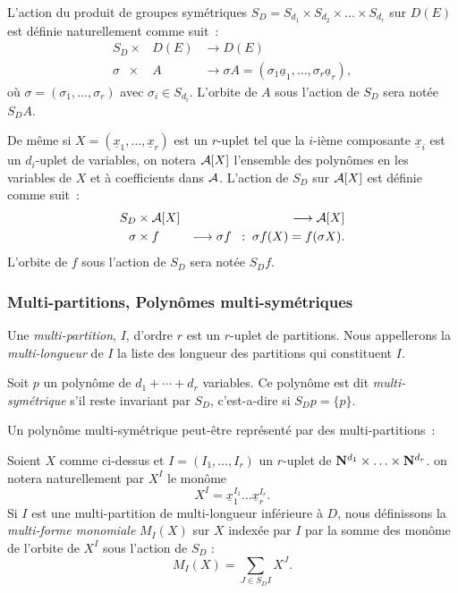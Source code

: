 L'action du produit de groupes  sym\'etriques 
$S_D=S_{d_1}\times S_{d_2} \times \ldots \times S_{d_r}$ sur $D(E)$ est 
d\'efinie naturellement comme suit~:  
\begin{eqnarray*}
            S_D \times& D(E) & \longrightarrow  D(E)\\
           \sigma\;\;  \times & A  & \longrightarrow 
         \sigma A=(\sigma_1{\underline a}_1,\ldots ,\sigma_r{\underline a}_r),
\end{eqnarray*}
o\`u $\sigma = (\sigma_1,\ldots ,\sigma_r)$ avec $\sigma_i \in
S_{d_i}$. L'orbite de $A$ sous l'action de $S_D$ sera
not\'ee $S_DA$. 

De m\^eme si $X=({\underline x}_1, \ldots,{\underline x}_r)$ est un 
$r$-uplet tel que la $i$-i\`eme composante
${\underline x}_i$ est un $d_i$-uplet de variables, on notera ${\cal A}[X]$
l'ensemble des polyn\^omes en les variables de $X$ et \`a coefficients dans 
$\cal A$. 
L'action de $S_D$ sur ${\cal A}[X]$ est d\'efinie
comme suit~:
\begin{eqnarray*}
            S_D & \times {\cal A}[X] & \longrightarrow {\cal A}[X]\\
           \sigma & \times f  & \longrightarrow \sigma f \;\; :\;
         \sigma f(X)= f(\sigma X).
\end{eqnarray*}
L'orbite de $f$ sous l'action de $S_D$ sera
not\'ee $S_Df$.

\subsubsection*{Multi-partitions, Polyn\^omes multi-sym\'etriques}

Une {\it multi-partition}, $I$, d'ordre $r$ est un $r$-uplet de partitions.
Nous appellerons la {\it multi-longueur} de $I$ la liste des longueur
des partitions qui constituent $I$.

Soit $p$ un polyn\^ome de $d_1+\cdots + d_r$ variables. Ce polyn\^ome
est dit {\it multi-sym\'etrique} s'il reste invariant par $S_D$,
c'est-a-dire si $S_D p =\{p\}$.

Un polyn\^ome multi-sym\'etrique peut-\^etre repr\'esent\'e par des
multi-partitions~:

Soient $X$ comme ci-dessus et $I=(I_1,\ldots,I_r)$ un 
$r$-uplet de ${\bf N}^{d_1}\times \ldots \times {\bf N}^{d_r}$.
on notera naturellement par $X^I$ le mon\^ome 
$$
X^I = {\underline x}_1^{I_1}\ldots{\underline
x}_r^{I_r}. 
$$
Si $I$ est une multi-partition de multi-longueur inf\'erieure \`a $D$,
nous d\'efinissons la
{\it multi-forme monomiale} $M_I(X)$ sur $X$ 
index\'ee par $I$ par la somme des mon\^ome de l'orbite de
$X^I$ sous l'action de $S_D$ :
$$
M_I(X) =\sum_{J \in S_DI} X^J.
$$

